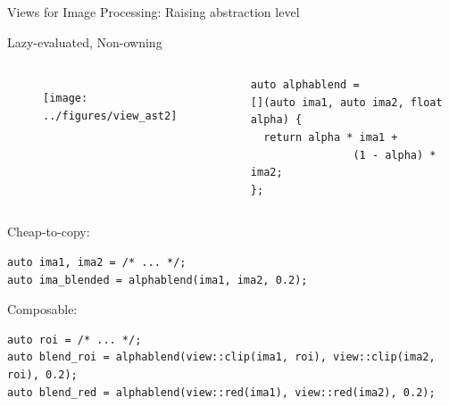 \documentclass[12pt,aspectratio=169]{beamer}
\begin{document}
\begin{frame}[fragile]{Views for Image Processing: Raising abstraction level}
  \begin{alertblock}{Lazy-evaluated, Non-owning}
    \begin{columns}[T,onlytextwidth]
      \centering
      \begin{figure}
        \texttt{[image: ../figures/view\_ast2]}
      \end{figure}

      \begin{verbatim}
auto alphablend =
[](auto ima1, auto ima2, float alpha) {
  return alpha * ima1 +
                (1 - alpha) * ima2;
};
  \end{verbatim}
    \end{columns}
  \end{alertblock}

  \begin{alertblock}{Cheap-to-copy:}
    \begin{verbatim}
auto ima1, ima2 = /* ... */;
auto ima_blended = alphablend(ima1, ima2, 0.2);
    \end{verbatim}
  \end{alertblock}

  \begin{alertblock}{Composable:}
    \begin{verbatim}
auto roi = /* ... */;
auto blend_roi = alphablend(view::clip(ima1, roi), view::clip(ima2, roi), 0.2);
auto blend_red = alphablend(view::red(ima1), view::red(ima2), 0.2);
    \end{verbatim}
  \end{alertblock}

\end{frame}
\end{document}
